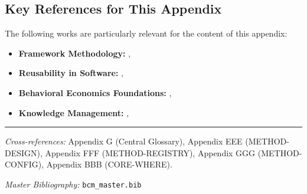 \vspace{0.5em}

\subsection{Key References for This Appendix}

The following works are particularly relevant for the content of this appendix:

\begin{itemize}[nosep]
    \item \textbf{Framework Methodology:} \citet{kuhn1962structure}, \citet{lakatos1970falsification}
    \item \textbf{Reusability in Software:} \citet{parnas1972criteria}, \citet{gamma1994design}
    \item \textbf{Behavioral Economics Foundations:} \citet{kahneman1979prospect}, \citet{thaler2008nudge}
    \item \textbf{Knowledge Management:} \citet{nonaka1995knowledge}, \citet{davenport1998working}
\end{itemize}

\nocite{bcm_master}



\vspace{1em}
\hrule
\vspace{0.5em}

\noindent\textit{Cross-references:}
Appendix G (Central Glossary),
Appendix EEE (METHOD-DESIGN),
Appendix FFF (METHOD-REGISTRY),
Appendix GGG (METHOD-CONFIG),
Appendix BBB (CORE-WHERE).

\noindent\textit{Master Bibliography:} \texttt{bcm\_master.bib}


